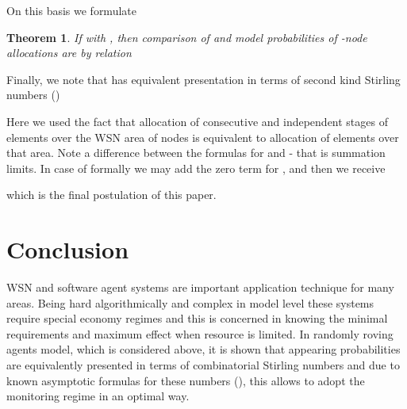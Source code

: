\documentclass[conference]{IEEEtran}
\newtheorem{theorem}	{Theorem}
\begin{document}
On this basis we formulate

\begin{theorem}
If  with , then comparison of  and  model probabilities of  -node allocations are by relation

\end{theorem}
Finally, we note that  has equivalent presentation in terms of second kind Stirling numbers (\cite{chelluri}) 

Here we used the fact that allocation of  consecutive and independent stages of  elements over the WSN area of  nodes is equivalent to allocation of  elements over that area. Note a difference between the formulas for  and  - that is summation limits. In case of  formally we may add the zero term for , and then we receive

which is the final postulation of this paper.

\section{Conclusion}
WSN and software agent systems are important application technique for many areas. Being hard algorithmically and complex in model level these systems require special economy regimes and this is concerned in knowing the minimal requirements and maximum effect when resource is limited. In randomly roving agents model, which is considered above, it is shown that appearing probabilities are equivalently presented in terms of combinatorial Stirling numbers and due to known asymptotic formulas for these numbers (\cite{chelluri}), this allows to adopt the monitoring regime in an optimal way.




\end{document}

